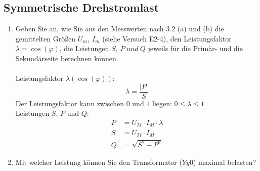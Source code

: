\subsection{Symmetrische Drehstromlast }
\begin{enumerate}[label=\alph*)]
  \item Geben Sie an, wie Sie aus den Messwerten nach 3.2 (a) und (b) die gemittelten
        Größen $U_m,\ I_m$ (siehe Versuch E2-4), den Leistungsfaktor
        $\lambda=\cos(\varphi)$, die Leistungen $S,\ P\ und\ Q$ jeweils für die Primär-
        und die Sekundärseite berechnen können.\\ \ \\ Leistungsfaktor $\lambda(\cos
            (\varphi))$:
        \[ \lambda = \frac{|P|}{S} \]
        Der Leistungsfaktor kann zwischen $0$ und $1$ liegen: $0 \leq \lambda \leq 1
        $\\ Leistungen $S$, $P$ und $Q$:\\
        \begin{align*}
          P & = U_M\cdot I_M\cdot \lambda \\
          S & = U_M\cdot I_M              \\
          Q & = \sqrt{S^2-P^2}
        \end{align*}

  \item Mit welcher Leistung können Sie den Transformator ($Yy0$) maximal belasten?
\end{enumerate}
